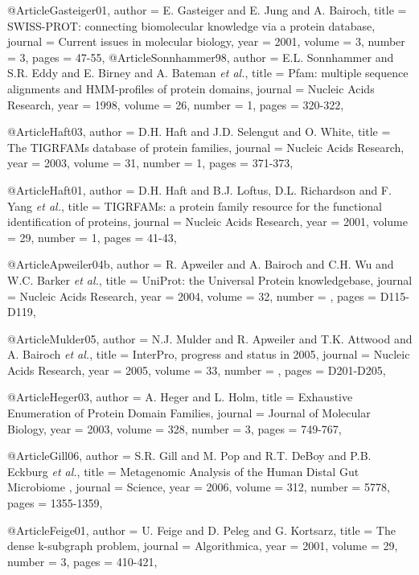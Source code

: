 @Article{Gasteiger01,
  author = {E. Gasteiger and E. Jung and A. Bairoch},
  title =  {{SWISS-PROT}: connecting biomolecular knowledge via a protein database},
  journal = {Current issues in molecular biology},
  year = {2001},
  volume =  {3},
  number =  {3},
  pages =   {47-55},
}
@Article{Sonnhammer98,
  author = {E.L. Sonnhammer and S.R. Eddy and E. Birney and A. Bateman {\it et al.}},
  title =  {{Pfam}: multiple sequence alignments and {HMM}-profiles of protein domains},
  journal = {Nucleic Acids Research},
  year = {1998},
  volume =  {26},
  number =  {1},
  pages =   {320-322},
}

@Article{Haft03,
  author = {D.H. Haft and J.D. Selengut and O. White},
  title =  {The {TIGRFAMs} database of protein families},
  journal = {Nucleic Acids Research},
  year = {2003},
  volume =  {31},
  number =  {1},
  pages =   {371-373},
}

@Article{Haft01,
  author = {D.H. Haft and B.J. Loftus, D.L. Richardson and F. Yang {\it et al.}},
  title =  {{TIGRFAMs}: a protein family resource for the functional identification of proteins},
  journal = {Nucleic Acids Research},
  year = {2001},
  volume =  {29},
  number =  {1},
  pages =   {41-43},
}


@Article{Apweiler04b,
  author = {R. Apweiler and A. Bairoch and C.H. Wu and W.C. Barker {\it et al.}},
  title =  {{UniProt}: the Universal Protein knowledgebase},
  journal = {Nucleic Acids Research},
  year = {2004},
  volume =  {32},
  number =  {},
  pages =   {D115-D119},
}

@Article{Mulder05,
  author = {N.J. Mulder and R. Apweiler and T.K. Attwood and A. Bairoch {\it et al.}},
  title =  {{InterPro}, progress and status in 2005},
  journal = {Nucleic Acids Research},
  year = {2005},
  volume =  {33},
  number =  {},
  pages =   {D201-D205},
}


@Article{Heger03,
  author = {A. Heger and L. Holm},
  title =  {Exhaustive Enumeration of Protein Domain Families},
  journal = {Journal of Molecular Biology},
  year = {2003},
  volume =  {328},
  number =  {3},
  pages =   {749-767},
}

@Article{Gill06,
  author = {S.R. Gill and M. Pop and R.T. DeBoy and P.B. Eckburg {\it et al.}},
  title =  {{Metagenomic} Analysis of the Human Distal Gut Microbiome },
  journal = {Science},
  year = {2006},
  volume =  {312},
  number =  {5778},
  pages =   {1355-1359},
}


@Article{Feige01,
  author = {U. Feige and D. Peleg and G. Kortsarz},
  title =  {The dense k-subgraph problem},
  journal = {Algorithmica},
  year = {2001},
  volume =  {29},
  number =  {3},
  pages =   {410-421},
}


